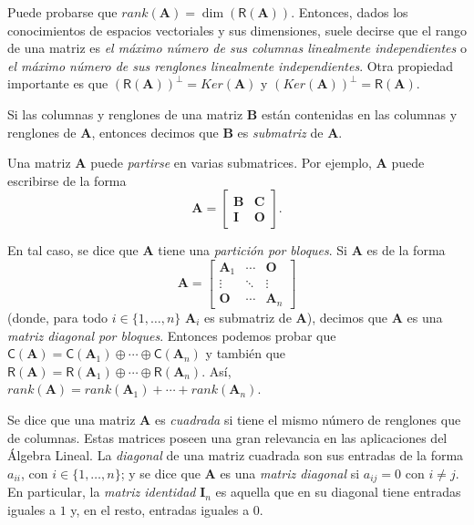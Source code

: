             Puede probarse que $rank(\mathbf{A})= \dim(\mathsf{R}(\mathbf{A}))$. Entonces, dados los conocimientos de espacios vectoriales y sus dimensiones, suele decirse que el rango de una matriz es \textit{el máximo número de sus columnas linealmente independientes} o \textit{el máximo número de sus renglones linealmente independientes}. Otra propiedad importante es  que $(\mathsf{R}(\mathbf{A}))^{\perp} = Ker(\mathbf{A})$ y $(Ker(\mathbf{A}))^{\perp} = \mathsf{R}(\mathbf{A})$.
            
             Si las columnas y renglones de una matriz $\mathbf{B}$ están contenidas en las columnas y renglones de $\mathbf{A}$, entonces decimos que $\mathbf{B}$ es \textit{submatriz} de $\mathbf{A}$. 
            
             Una matriz $\mathbf{A}$ puede \textit{partirse} en varias submatrices. Por ejemplo, $\mathbf{A}$ puede escribirse de la forma $$\mathbf{A} = \begin{bmatrix}
            \mathbf{B} & \mathbf{C} \\
            \mathbf{I} & \mathbf{O}
            \end{bmatrix}.$$ 
            
            En tal caso, se dice que $\mathbf{A}$ tiene una \textit{partición por} \textit{bloques}. Si $\mathbf{A}$ es de la forma $$\mathbf{A} = \begin{bmatrix}
            \mathbf{A}_{1} & \cdots & \mathbf{O} \\
            \vdots & \ddots & \vdots \\
            \mathbf{O} & \cdots & \mathbf{A}_{n}
            \end{bmatrix}$$ (donde, para todo $i\in\{1,\ldots,n\}$ $\mathbf{A}_{i}$ es submatriz de $\mathbf{A}$), decimos que $\mathbf{A}$ es una  \textit{matriz diagonal por bloques}. Entonces podemos probar que $\mathsf{C}(\mathbf{A}) = \mathsf{C}(\mathbf{A}_{1})\oplus \cdots \oplus \mathsf{C}(\mathbf{A}_{n})$ y también que $\mathsf{R}(\mathbf{A}) = \mathsf{R}(\mathbf{A}_{1})\oplus \cdots \oplus \mathsf{R}(\mathbf{A}_{n})$. Así, $rank(\mathbf{A}) = rank(\mathbf{A}_{1})+ \cdots + rank(\mathbf{A}_{n})$.
            
            Se dice que una matriz $\mathbf{A}$ es \textit{cuadrada}  si tiene el mismo número de renglones que de columnas. Estas matrices poseen una gran relevancia en las aplicaciones del Álgebra Lineal. La \textit{diagonal} de una matriz cuadrada son sus entradas de la forma $a_{ii}$, con $i \in \{1, \ldots, n\}$; y se dice que $\mathbf{A}$ es una \textit{matriz diagonal} si $a_{ij} = 0$ con $i\neq j$. En particular, la \textit{matriz identidad}  $\mathbf{I}_{n}$ es aquella que en su diagonal tiene entradas iguales a $1$ y, en el resto, entradas iguales a $0$. 
            
